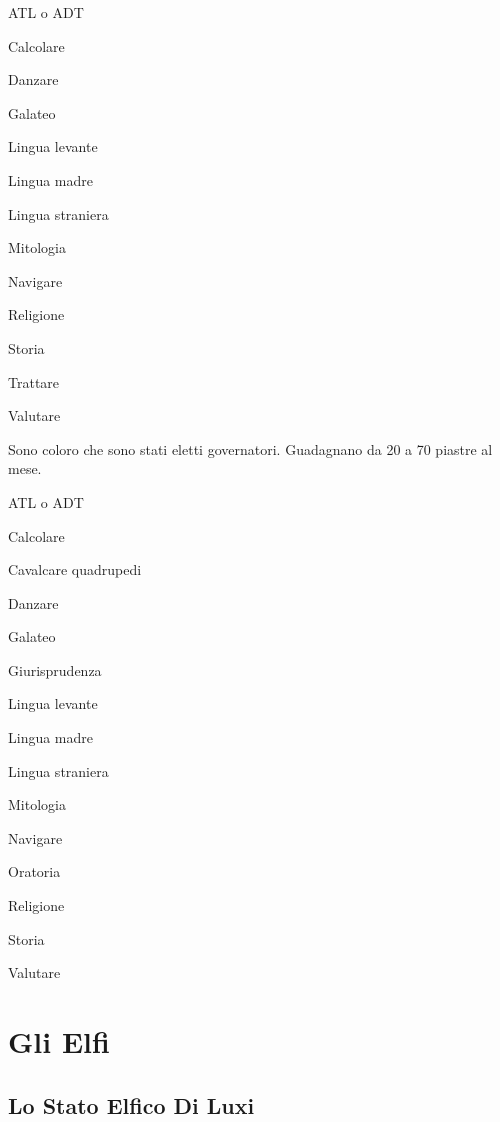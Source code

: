 \begin{abilist}
\item ATL o ADT
\item Calcolare 
\item Danzare
\item Galateo
\item Lingua levante
\item Lingua madre
\item Lingua straniera 
\item Mitologia
\item Navigare
\item Religione
\item Storia 
\item Trattare
\item Valutare
\end{abilist}


Sono coloro che sono stati eletti governatori. Guadagnano da 20 a 70
piastre al mese.

\begin{abilist}
\item ATL o ADT
\item Calcolare
\item Cavalcare quadrupedi
\item Danzare
\item Galateo
\item Giurisprudenza
\item Lingua levante
\item Lingua madre
\item Lingua straniera
\item Mitologia
\item Navigare
\item Oratoria
\item Religione
\item Storia
\item Valutare
\end{abilist}


\section{Gli Elfi} 

\subsection{Lo Stato Elfico Di Luxi}


